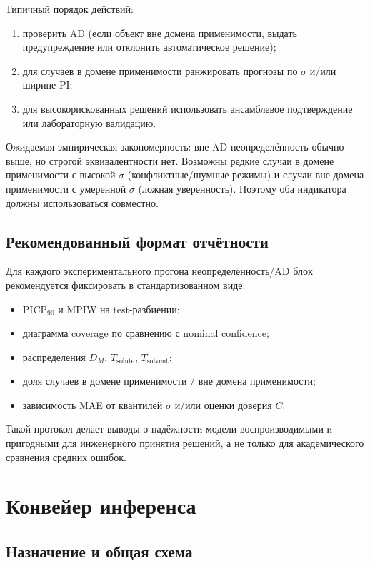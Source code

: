 \documentclass[11pt]{article}
\begin{document}
Типичный порядок действий:
\begin{enumerate}
  \item проверить AD (если объект вне домена применимости, выдать предупреждение или отклонить автоматическое решение);
  \item для случаев в домене применимости ранжировать прогнозы по $\sigma$ и/или ширине PI;
  \item для высокорискованных решений использовать ансамблевое подтверждение или лабораторную валидацию.
\end{enumerate}

Ожидаемая эмпирическая закономерность: вне AD неопределённость обычно выше, но строгой эквивалентности нет. Возможны редкие случаи в домене применимости с высокой $\sigma$ (конфликтные/шумные режимы) и случаи вне домена применимости с умеренной $\sigma$ (ложная уверенность). Поэтому оба индикатора должны использоваться совместно.

\subsection{Рекомендованный формат отчётности}

Для каждого экспериментального прогона неопределённость/AD блок рекомендуется фиксировать в стандартизованном виде:
\begin{itemize}
  \item $\mathrm{PICP}_{90}$ и MPIW на test-разбиении;
  \item диаграмма coverage по сравнению с nominal confidence;
  \item распределения $D_M$, $T_{\mathrm{solute}}$, $T_{\mathrm{solvent}}$;
  \item доля случаев в домене применимости / вне домена применимости;
  \item зависимость MAE от квантилей $\sigma$ и/или оценки доверия $C$.
\end{itemize}

Такой протокол делает выводы о надёжности модели воспроизводимыми и пригодными для инженерного принятия решений, а не только для академического сравнения средних ошибок.

\section{Конвейер инференса}

\subsection{Назначение и общая схема}
\end{document}
